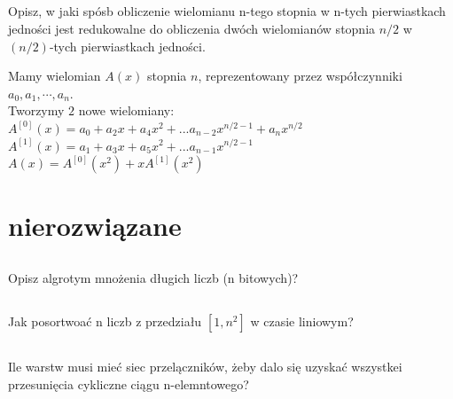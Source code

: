 \documentclass[svgnames]{report}
\begin{document}
\section{}
\begin{framed}
Opisz, w jaki spósb obliczenie wielomianu n-tego stopnia w n-tych pierwiastkach jedności jest redukowalne do obliczenia dwóch wielomianów stopnia $n/2$ w $(n/2)$-tych pierwiastkach jedności.
\end{framed}

Mamy wielomian $A(x)$ stopnia $n$, reprezentowany przez współczynniki $a_0, a_1, \cdots, a_n$.\\
Tworzymy $2$ nowe wielomiany:\\
$A^{[0]}(x)=a_0 + a_2 x + a_4 x^2 + ... a_{n-2} x^{n/2 -1} + a_n x^{n/2}$\\
$A^{[1]}(x)=a_1 + a_3 x + a_5 x^2 + ... a_{n-1} x^{n/2 -1}$\\

$A(x) = A^{[0]}(x^2)+xA^{[1]}(x^2)$\\

\chapter{nierozwiązane}
\section{}
\begin{framed}
Opisz algrotym mnożenia długich liczb (n bitowych)?
\end{framed}

\section{} 
\begin{framed}
Jak posortwoać n liczb z przedziału $[1, n^2]$ w  czasie liniowym?
\end{framed}

\section{}
\begin{framed}
Ile warstw musi mieć siec przelączników, żeby dalo się uzyskać wszystkei przesunięcia cykliczne ciągu n-elemntowego?
\end{framed}
\end{document}
